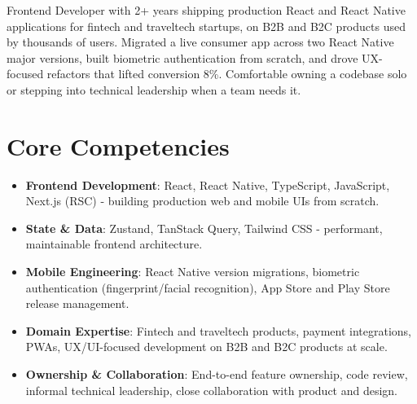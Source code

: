 \documentclass[11pt,a4paper,sans]{moderncv}
\begin{document}
\makecvtitle


\vspace{6pt}
\small{Frontend Developer with 2+ years shipping production React and React Native applications for fintech and traveltech startups, on B2B and B2C products used by thousands of users. Migrated a live consumer app across two React Native major versions, built biometric authentication from scratch, and drove UX-focused refactors that lifted conversion 8\%. Comfortable owning a codebase solo or stepping into technical leadership when a team needs it.}


\section{Core Competencies}
\vspace{1pt}
\begin{itemize}

\item \textbf{Frontend Development}: React, React Native, TypeScript, JavaScript, Next.js (RSC) - building production web and mobile UIs from scratch.

\item \textbf{State \& Data}: Zustand, TanStack Query, Tailwind CSS - performant, maintainable frontend architecture.

\item \textbf{Mobile Engineering}: React Native version migrations, biometric authentication (fingerprint/facial recognition), App Store and Play Store release management.

\item \textbf{Domain Expertise}: Fintech and traveltech products, payment integrations, PWAs, UX/UI-focused development on B2B and B2C products at scale.

\item \textbf{Ownership \& Collaboration}: End-to-end feature ownership, code review, informal technical leadership, close collaboration with product and design.

\end{itemize}

\end{document}
